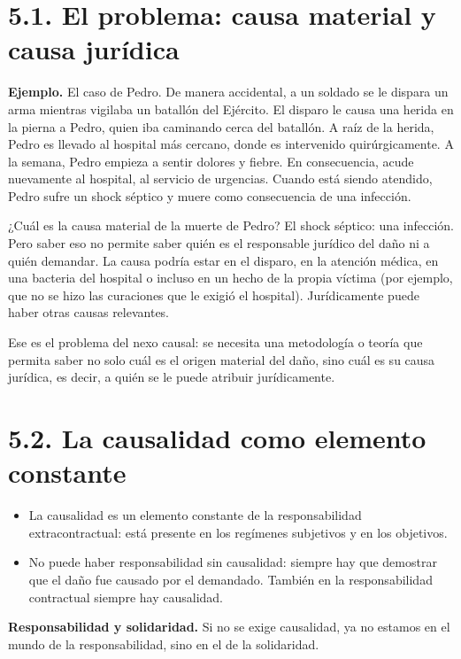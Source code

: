
\section{5.1. El problema: causa material y causa jurídica}
\begin{ejemplo}
\textcolor[HTML]{4F6228}{\textbf{Ejemplo. }}El caso de Pedro. De manera accidental, a un soldado se le dispara un arma mientras vigilaba un batallón del Ejército. El disparo le causa una herida en la pierna a Pedro, quien iba caminando cerca del batallón. A raíz de la herida, Pedro es llevado al hospital más cercano, donde es intervenido quirúrgicamente. A la semana, Pedro empieza a sentir dolores y fiebre. En consecuencia, acude nuevamente al hospital, al servicio de urgencias. Cuando está siendo atendido, Pedro sufre un shock séptico y muere como consecuencia de una infección.
\end{ejemplo}
¿Cuál es la causa material de la muerte de Pedro? El shock séptico: una infección. Pero saber eso no permite saber quién es el responsable jurídico del daño ni a quién demandar. La causa podría estar en el disparo, en la atención médica, en una bacteria del hospital o incluso en un hecho de la propia víctima (por ejemplo, que no se hizo las curaciones que le exigió el hospital). Jurídicamente puede haber otras causas relevantes.

Ese es el problema del nexo causal: se necesita una metodología o teoría que permita saber no solo cuál es el origen material del daño, sino cuál es su causa jurídica, es decir, a quién se le puede atribuir jurídicamente.

\section{5.2. La causalidad como elemento constante}
\begin{itemize}
\item La causalidad es un elemento constante de la responsabilidad extracontractual: está presente en los regímenes subjetivos y en los objetivos.
\item No puede haber responsabilidad sin causalidad: siempre hay que demostrar que el daño fue causado por el demandado. También en la responsabilidad contractual siempre hay causalidad.
\end{itemize}
\textbf{Responsabilidad y solidaridad.} Si no se exige causalidad, ya no estamos en el mundo de la responsabilidad, sino en el de la solidaridad.

